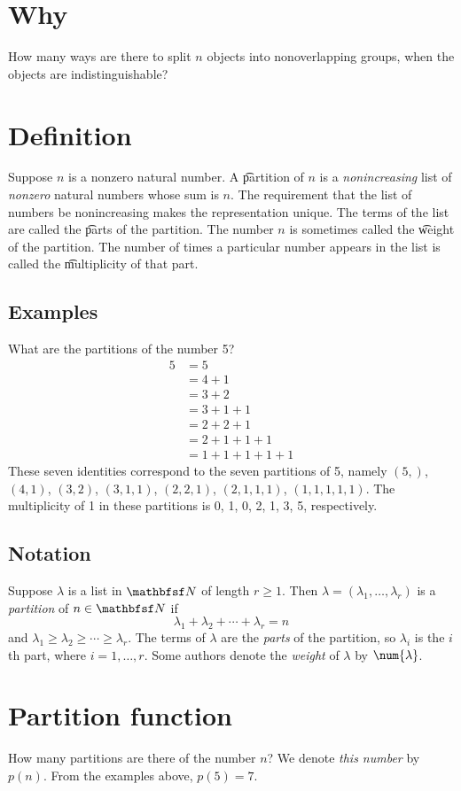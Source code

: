 
\section*{Why}

How many ways are there to split $n$ objects into nonoverlapping groups, when the objects are indistinguishable?

\section*{Definition}

Suppose $n$ is a nonzero natural number.
A \t{partition} of $n$ is a \textit{nonincreasing} list of \textit{nonzero} natural numbers whose sum is $n$.
The requirement that the list of numbers be nonincreasing makes the representation unique.
The terms of the list are called the \t{parts} of the partition.
The number $n$ is sometimes called the \t{weight} of the partition.
The number of times a particular number appears in the list is called the \t{multiplicity} of that part.

\subsection*{Examples}

What are the partitions of the number 5?
\[
\begin{aligned}
5
&= 5 \\
&= 4 + 1 \\
&= 3 + 2 \\
&= 3 + 1 + 1 \\
&= 2 + 2 + 1 \\
&= 2 + 1 + 1 + 1 \\
&= 1 + 1 + 1 + 1 + 1
\end{aligned}
\]
These seven identities correspond to the seven partitions of 5, namely $(5,)$, $(4, 1)$, $(3, 2)$, $(3,1,1)$, $(2,2,1)$, $(2,1,1,1)$, $(1,1,1,1,1)$.
The multiplicity of 1 in these partitions is 0, 1, 0, 2, 1, 3, 5, respectively.

\subsection*{Notation}

Suppose $\lambda $ is a list in $\N  $ of length $r \geq 1$.
Then $\lambda  = (\lambda _1, \dots , \lambda _r)$ is a \textit{partition} of $n \in \N  $ if
\[
\lambda _1 + \lambda _2 + \cdots + \lambda _r = n
\]
and $\lambda _1 \geq \lambda _2 \geq \cdots \geq \lambda _r$.
The terms of $\lambda $ are the \textit{parts} of the partition, so $\lambda _i$ is the $i$th part, where $i = 1, \dots , r$.
Some authors denote the \textit{weight} of $\lambda $ by $\num{\lambda }$.

\section*{Partition function}

How many partitions are there of the number $n$?
We denote \textit{this number} by $p(n).$
From the examples above, $p(5) = 7$.

\blankpage